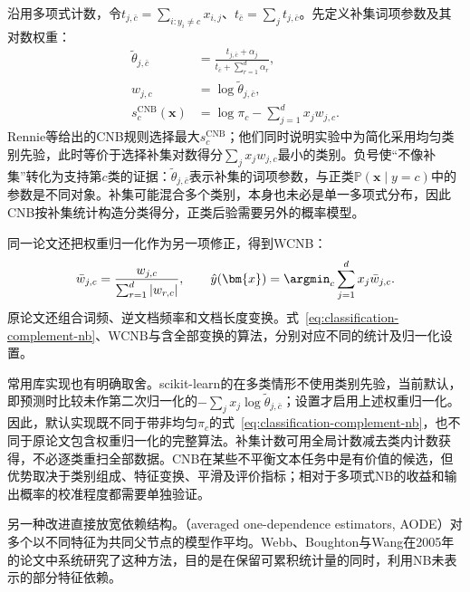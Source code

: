 沿用多项式计数，令$t_{j,\bar c}=\sum_{i:y_i\neq c}x_{i,j}$、$t_{\bar c}=\sum_jt_{j,\bar c}$。先定义补集词项参数及其对数权重：
\begin{equation}
  \label{eq:classification-complement-nb}
  \begin{aligned}
    \tilde\theta_{j,\bar c}
      &=\frac{t_{j,\bar c}+\alpha_j}
              {t_{\bar c}+\sum_{r=1}^{d}\alpha_r},\\
    w_{j,c}&=\log\tilde\theta_{j,\bar c},\\
    s_c^{\mathrm{CNB}}(\bm{x})
      &=\log\pi_c-\sum_{j=1}^{d}x_jw_{j,c}.
  \end{aligned}
\end{equation}
Rennie等给出的CNB规则选择最大$s_c^{\mathrm{CNB}}$；他们同时说明实验中为简化采用均匀类别先验，此时等价于选择补集对数得分$\sum_jx_jw_{j,c}$最小的类别。负号使“不像补集”转化为支持第$c$类的证据：$\tilde\theta_{j,\bar c}$表示补集的词项参数，与正类$\mathbb{P}(\bm{x}\mid y=c)$中的参数是不同对象。补集可能混合多个类别，本身也未必是单一多项式分布，因此CNB按补集统计构造分类得分，正类后验需要另外的概率模型。

同一论文还把权重归一化作为另一项修正，得到WCNB：
\[
  \bar w_{j,c}
  =\frac{w_{j,c}}{\sum_{r=1}^{d}|w_{r,c}|},
  \qquad
  \hat y(\bm{x})
  =\argmin_c\sum_{j=1}^{d}x_j\bar w_{j,c}.
\]
原论文还组合词频、逆文档频率和文档长度变换。式~\eqref{eq:classification-complement-nb}、WCNB与含全部变换的算法，分别对应不同的统计及归一化设置。

常用库实现也有明确取舍。scikit-learn的在多类情形不使用类别先验，当前默认，即预测时比较未作第二次归一化的$-\sum_jx_j\log\tilde\theta_{j,\bar c}$；设置才启用上述权重归一化。因此，默认实现既不同于带非均匀$\pi_c$的式~\eqref{eq:classification-complement-nb}，也不同于原论文包含权重归一化的完整算法。补集计数可用全局计数减去类内计数获得，不必逐类重扫全部数据。CNB在某些不平衡文本任务中是有价值的候选，但优势取决于类别组成、特征变换、平滑及评价指标；相对于多项式NB的收益和输出概率的校准程度都需要单独验证。

另一种改进直接放宽依赖结构。（averaged one-dependence estimators, AODE）对多个以不同特征为共同父节点的模型作平均。Webb、Boughton与Wang在2005年的论文中系统研究了这种方法，目的是在保留可累积统计量的同时，利用NB未表示的部分特征依赖。

